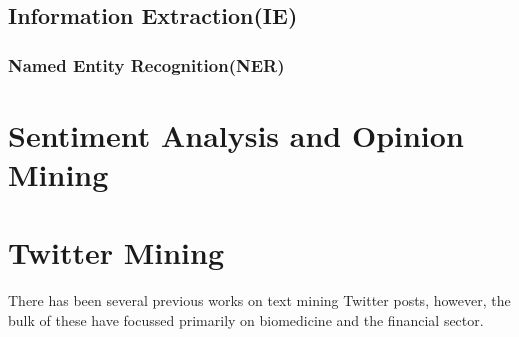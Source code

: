 \subsection[Information Extraction]{Information Extraction(IE)}

\subsubsection{Named Entity Recognition(NER)}

\section[Sentiment Analysis]{Sentiment Analysis and Opinion Mining}

\section{Twitter Mining}
There has been several previous works on text mining Twitter posts, however, the bulk of these have focussed primarily on biomedicine and the financial sector.


